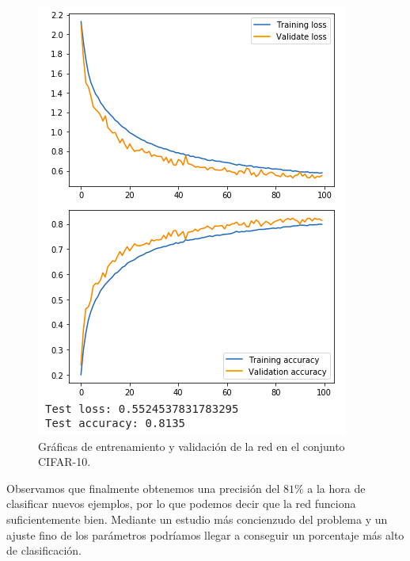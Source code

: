 \documentclass[
  a4paper,
  12pt,
  spanish,
]{scrartcl}
\theoremstyle{teorema-style}
\begin{document}
\begin{figure}[h]
  \centering
  \includegraphics[width=.7\textwidth]{img/graficascifar}
  \caption{Gráficas de entrenamiento y validación de la red en el conjunto CIFAR-10.}
  \label{fig:cifar-result}
\end{figure}

Observamos que finalmente obtenemos una precisión del $81 \%$ a la hora de clasificar nuevos ejemplos, por lo que podemos decir que la red funciona suficientemente bien. Mediante un estudio más concienzudo del problema y un ajuste fino de los parámetros podríamos llegar a conseguir un porcentaje más alto de clasificación.


\newpage
\printbibliography
\end{document}
